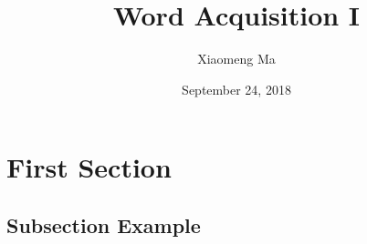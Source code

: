\documentclass{beamer}
\title[LNG 230/SPV 221 Language Acquisition]{Word Acquisition I} %
\author{Xiaomeng Ma} %
\institute[Graduate Center, CUNY] %
{Graduate Center, CUNY \\ %
\medskip
\textit{xma3@gradcenter.cuny.edu} %
}
\date{September 24, 2018} %
\begin{document}
\begin{frame}
\titlepage %
\end{frame}



\section{First Section} %

\subsection{Subsection Example} %
\end{document}
